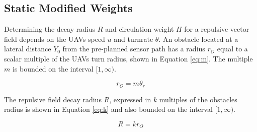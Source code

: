 \documentclass[conf]{new-aiaa}
\begin{document}
%
%
%
%
%
%
%
%
%



\subsection{Static Modified Weights}

Determining the decay radius $R$ and circulation weight $H$ for a repulsive vector field depends on the UAVs speed $u$ and turnrate $\dot{\theta}$. An obstacle located at a lateral distance $Y_0$ from the pre-planned sensor path has a radius $r_O$ equal to a scalar multiple of the UAVs turn radius, shown in Equation \ref{eq:m}. The multiple $m$ is bounded on the interval $[1,\infty)$.

\begin{equation}
\label{eq:m}
r_O = m \theta_r
\end{equation}

The repulsive field decay radius $R$, expressed in $k$ multiples of the obstacles radius is shown in Equation \ref{eq:k} and also bounded on the interval $[1,\infty)$.

\begin{equation}
\label{eq:k}
R = k r_O
\end{equation}
\end{document}
